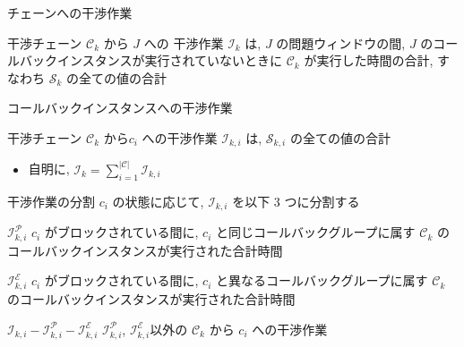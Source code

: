 \begin{frame}{チェーンへの干渉作業}
    \begin{definition}[チェーンへの干渉作業]
        干渉チェーン $\mathcal{C}_{k}$ から $J$ への 干渉作業 $\mathcal{I}_{k}$ は, $J$ の問題ウィンドウの間, $J$ のコールバックインスタンスが実行されていないときに $\mathcal{C}_{k}$ が実行した時間の合計, すなわち $\mathcal{S}_{k}$ の全ての値の合計
    \end{definition}
\end{frame}

\begin{frame}{コールバックインスタンスへの干渉作業}
    \begin{definition}[コールバックインスタンスへの干渉作業]
        干渉チェーン $\mathcal{C}_{k}$ から$c_{i}$ への干渉作業 $\mathcal{I}_{k, i}$ は, $\mathcal{S}_{k, i}$ の全ての値の合計
    \end{definition}
    \vspace{5mm}
    \begin{itemize}
        \item 自明に, $\mathcal{I}_{k}=\sum_{i=1}^{|\mathcal{C}|} \mathcal{I}_{k, i}$
    \end{itemize}
\end{frame}

\begin{frame}{干渉作業の分割}
    \vspace{-1mm}
    $c_{i}$ の状態に応じて, $\mathcal{I}_{k, i}$ を以下 3 つに分割する
    \vspace{-1mm}
    \begin{block}{$\mathcal{I}_{k, i}^{\mathcal{P}}$}
        $c_{i}$ がブロックされている間に, $c_{i}$ と同じコールバックグループに属す $\mathcal{C}_{k}$ のコールバックインスタンスが実行された合計時間
    \end{block}
    \begin{block}{$\mathcal{I}_{k, i}^{\mathcal{E}}$}
        $c_{i}$ がブロックされている間に, $c_{i}$ と異なるコールバックグループに属す $\mathcal{C}_{k}$ のコールバックインスタンスが実行された合計時間
    \end{block}
    \begin{block}{$\mathcal{I}_{k, i}-\mathcal{I}_{k, i}^{\mathcal{P}}-\mathcal{I}_{k, i}^{\mathcal{E}}$}
        $\mathcal{I}_{k, i}^{\mathcal{P}}$, $\mathcal{I}_{k, i}^{\mathcal{E}}$以外の $\mathcal{C}_{k}$ から $c_{i}$ への干渉作業
    \end{block}
\end{frame}

